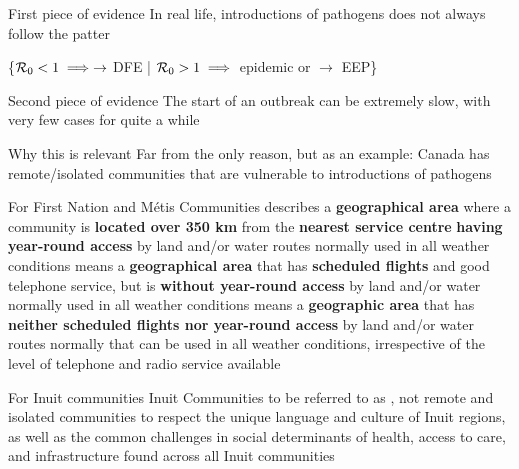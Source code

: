 \documentclass[aspectratio=169]{beamer}\usepackage[]{graphicx}\usepackage[]{xcolor}
\begin{document}
\begin{frame}{First piece of evidence}
In real life, introductions of pathogens does not always follow the patter
\begin{center}
\{$\mathcal{R}_0<1 \implies \to$ DFE | $\mathcal{R}_0>1 \implies $ epidemic or $\to$ EEP\} 
\end{center}
\end{frame}


\begin{frame}{Second piece of evidence}
The start of an outbreak can be extremely slow, with very few cases for quite a while
\end{frame}


\begin{frame}{Why this is relevant}
Far from the only reason, but as an example: Canada has remote/isolated communities that are vulnerable to introductions of pathogens
\end{frame}


\begin{frame}{For First Nation and Métis Communities}
   describes a \textbf{geographical area} where a community is \textbf{located over 350 km} from the \textbf{nearest service centre} \textbf{having year-round access} by land and/or water routes normally used in all weather conditions
  \vfill	
   means a \textbf{geographical area} that has \textbf{scheduled flights} and good telephone service, but is \textbf{without year-round access} by land and/or water normally used in all weather conditions
  \vfill
   means a \textbf{geographic area} that has \textbf{neither scheduled flights nor year-round access} by land and/or water routes normally that can be used in all weather conditions, irrespective of the level of telephone and radio service available
\end{frame}

\begin{frame}{For Inuit communities}
  Inuit Communities to be referred to as , not remote and isolated communities to respect the unique language and culture of Inuit regions, as well as the common challenges in social determinants of health, access to care, and infrastructure found across all Inuit communities
\end{frame}
\end{document}
